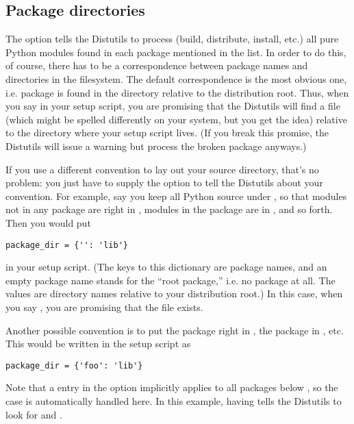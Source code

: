 \documentclass{howto}
\begin{document}
\subsection{Package directories}
\label{sec:package-dirs}

The  option tells the Distutils to process (build,
distribute, install, etc.) all pure Python modules found in each package
mentioned in the  list.  In order to do this, of
course, there has to be a correspondence between package names and
directories in the filesystem.  The default correspondence is the most
obvious one, i.e. package  is found in the directory
 relative to the distribution root.  Thus, when you say
 in your setup script, you are promising that
the Distutils will find a file  (which might
be spelled differently on your system, but you get the idea) relative to
the directory where your setup script lives.  (If you break this
promise, the Distutils will issue a warning but process the broken
package anyways.)

If you use a different convention to lay out your source directory,
that's no problem: you just have to supply the 
option to tell the Distutils about your convention.  For example, say
you keep all Python source under , so that modules not in any
package are right in , modules in the  package
are in , and so forth.  Then you would put
\begin{verbatim}
package_dir = {'': 'lib'}
\end{verbatim}
in your setup script.  (The keys to this dictionary are package names,
and an empty package name stands for the ``root package,'' i.e. no
package at all.  The values are directory names relative to your
distribution root.)  In this case, when you say
, you are promising that the file
 exists.

Another possible convention is to put the  package right in 
, the  package in , etc.  This
would be written in the setup script as
\begin{verbatim}
package_dir = {'foo': 'lib'}
\end{verbatim}
Note that a  entry in the
 option implicitly applies to all packages below
, so the  case is automatically handled
here.  In this example, having 
tells the Distutils to look for  and
.
\end{document}
